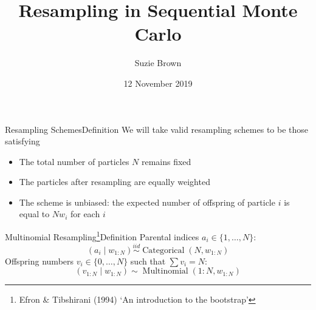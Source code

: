 \documentclass[aspectratio=169]{beamer}
\title[Resampling in SMC]{Resampling in Sequential Monte Carlo}
\author{Suzie Brown}
\date{12 November 2019}
\theoremstyle{definition}
\newcommand{\E}{\mathbb{E}}
\newcommand{\Cat}{\operatorname{Categorical}}
\newcommand{\Mn}{\operatorname{Multinomial}}
\newcommand{\vt}[1]{v_{#1}}
\newcommand{\wt}[1]{w_{#1}}
\begin{document}
\begin{frame}
\maketitle
\end{frame}


\begin{frame}{Resampling Schemes}{Definition}
%
We will take valid resampling schemes to be those satisfying
\begin{itemize}
\item The total number of particles $N$ remains fixed
\item The particles after resampling are equally weighted
\item The scheme is unbiased: the expected number of offspring of particle $i$ is equal to $N\wt{i}$ for each $i$
\end{itemize}

\end{frame}


\begin{frame}{Multinomial Resampling\footnote{Efron \& Tibshirani (1994) `An introduction to the bootstrap'}}{Definition}
Parental indices $a_i \in \{1,\dots,N\}$:
\begin{equation*}
(a_{i} \mid \wt{1:N}) \overset{iid}{\sim} \Cat(N, \wt{1:N})
\end{equation*}
Offspring numbers $\vt{i} \in \{0,\dots,N\}$ such that $\sum \vt{i} = N$:
\begin{equation*}
(\vt{1:N} \mid \wt{1:N}) \sim \Mn(1:N, \wt{1:N})
\end{equation*}

\end{frame}
\end{document}
